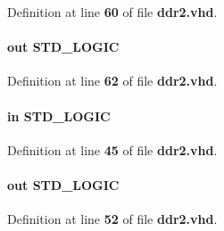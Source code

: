 Definition at line {\bf 60} of file {\bf ddr2.\+vhd}.

\paragraph[{phy\+\_\+clk}]{ {\bfseries \textcolor{keywordflow}{out}\textcolor{vhdlchar}{ }} {\bfseries \textcolor{comment}{S\+T\+D\+\_\+\+L\+O\+G\+IC}\textcolor{vhdlchar}{ }} \hspace{0.3cm}{\ttfamily [Port]}}\label{classddr2_a95a4f59a6cdea016adcef33ce0c38967}


Definition at line {\bf 62} of file {\bf ddr2.\+vhd}.

\paragraph[{pll\+\_\+ref\+\_\+clk}]{ {\bfseries \textcolor{keywordflow}{in}\textcolor{vhdlchar}{ }} {\bfseries \textcolor{comment}{S\+T\+D\+\_\+\+L\+O\+G\+IC}\textcolor{vhdlchar}{ }} \hspace{0.3cm}{\ttfamily [Port]}}\label{classddr2_ad520a3a09de61ae4540d47ba63e9e739}


Definition at line {\bf 45} of file {\bf ddr2.\+vhd}.

\paragraph[{reset\+\_\+phy\+\_\+clk\+\_\+n}]{ {\bfseries \textcolor{keywordflow}{out}\textcolor{vhdlchar}{ }} {\bfseries \textcolor{comment}{S\+T\+D\+\_\+\+L\+O\+G\+IC}\textcolor{vhdlchar}{ }} \hspace{0.3cm}{\ttfamily [Port]}}\label{classddr2_af882793cb9860e5b16b827cf4f6df098}


Definition at line {\bf 52} of file {\bf ddr2.\+vhd}.

